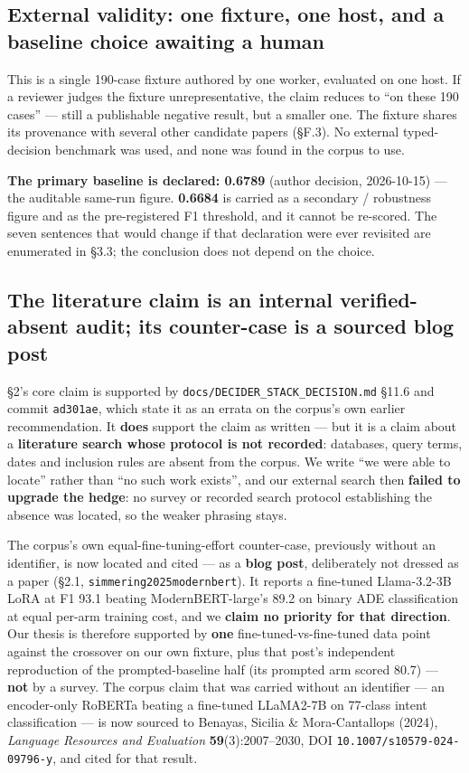 \documentclass[11pt,a4paper]{article}
\begin{document}
\subsection{External validity: one fixture, one host, and a baseline choice awaiting a human}

This is a single 190-case fixture authored by one worker, evaluated on one host. If a reviewer judges the fixture unrepresentative, the claim reduces to ``on these 190 cases'' --- still a publishable negative result, but a smaller one. The fixture shares its provenance with several other candidate papers (\S{}F.3). No external typed-decision benchmark was used, and none was found in the corpus to use.

\textbf{The primary baseline is declared: 0.6789} (author decision, 2026-10-15) --- the auditable same-run figure. \textbf{0.6684} is carried as a secondary / robustness figure and as the pre-registered F1 threshold, and it cannot be re-scored. The seven sentences that would change if that declaration were ever revisited are enumerated in \S3.3; the conclusion does not depend on the choice.

\subsection{The literature claim is an internal verified-absent audit; its counter-case is a sourced blog post}

\S2's core claim is supported by \texttt{docs/DECIDER\_STACK\_DECISION.md} \S11.6\cite{source_decider_stack_2026} and commit \texttt{ad301ae}, which state it as an errata on the corpus's own earlier recommendation. It \textbf{does} support the claim as written --- but it is a claim about a \textbf{literature search whose protocol is not recorded}: databases, query terms, dates and inclusion rules are absent from the corpus. We write ``we were able to locate'' rather than ``no such work exists'', and our external search then \textbf{failed to upgrade the hedge}: no survey or recorded search protocol establishing the absence was located, so the weaker phrasing stays.

The corpus's own equal-fine-tuning-effort counter-case, previously without an identifier, is now located and cited --- as a \textbf{blog post}, deliberately not dressed as a paper (\S2.1, \texttt{simmering2025modernbert}\cite{simmering2025modernbert}). It reports a fine-tuned Llama-3.2-3B LoRA at F1 93.1 beating ModernBERT-large's 89.2 on binary ADE classification at equal per-arm training cost, and we \textbf{claim no priority for that direction}. Our thesis is therefore supported by \textbf{one} fine-tuned-vs-fine-tuned data point against the crossover on our own fixture, plus that post's independent reproduction of the prompted-baseline half (its prompted arm scored 80.7) --- \textbf{not} by a survey. The corpus claim that was carried without an identifier --- an encoder-only RoBERTa beating a fine-tuned LLaMA2-7B on 77-class intent classification --- is now sourced to Benayas, Sicilia \& Mora-Cantallops (2024), \emph{Language Resources and Evaluation} \textbf{59}(3):2007--2030, DOI \texttt{10.1007/s10579-024-09796-y}, and cited for that result.
\end{document}
